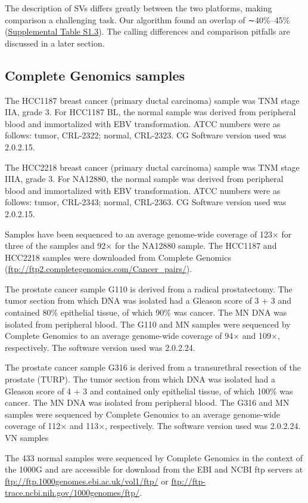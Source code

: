 The description of SVs differs greatly between the two platforms, making comparison a challenging task. Our algorithm found an overlap of ∼40\%–45\% (\href{https://genome.cshlp.org/content/25/9/1382/suppl/DC1}{Supplemental Table S1.3}). The calling differences and comparison pitfalls are discussed in a later section.

\subsection*{Complete Genomics samples}

The HCC1187 breast cancer (primary ductal carcinoma) sample was TNM stage IIA, grade 3. For HCC1187 BL, the normal sample was derived from peripheral blood and immortalized with EBV transformation. ATCC numbers were as follows: tumor, CRL-2322; normal, CRL-2323. CG Software version used was 2.0.2.15.

The HCC2218 breast cancer (primary ductal carcinoma) sample was TNM stage IIIA, grade 3. For NA12880, the normal sample was derived from peripheral blood and immortalized with EBV transformation. ATCC numbers were as follows: tumor, CRL-2343; normal, CRL-2363. CG Software version used was 2.0.2.15.

Samples have been sequenced to an average genome-wide coverage of 123× for three of the samples and 92× for the NA12880 sample. The HCC1187 and HCC2218 samples were downloaded from Complete Genomics (\url{ftp://ftp2.completegenomics.com/Cancer\_pairs/}).

The prostate cancer sample G110 is derived from a radical prostatectomy. The tumor section from which DNA was isolated had a Gleason score of 3 + 3 and contained 80\% epithelial tissue, of which 90\% was cancer. The MN DNA was isolated from peripheral blood. The G110 and MN samples were sequenced by Complete Genomics to an average genome-wide coverage of 94× and 109×, respectively. The software version used was 2.0.2.24.

The prostate cancer sample G316 is derived from a transurethral resection of the prostate (TURP). The tumor section from which DNA was isolated had a Gleason score of 4 + 3 and contained only epithelial tissue, of which 100\% was cancer. The MN DNA was isolated from peripheral blood. The G316 and MN samples were sequenced by Complete Genomics to an average genome-wide coverage of 112× and 113×, respectively. The software version used was 2.0.2.24.
VN samples

The 433 normal samples were sequenced by Complete Genomics in the context of the 1000G and are accessible for download from the EBI and NCBI ftp servers at \url{ftp://ftp.1000genomes.ebi.ac.uk/vol1/ftp/} or \url{ftp://ftp-trace.ncbi.nih.gov/1000genomes/ftp/}.

